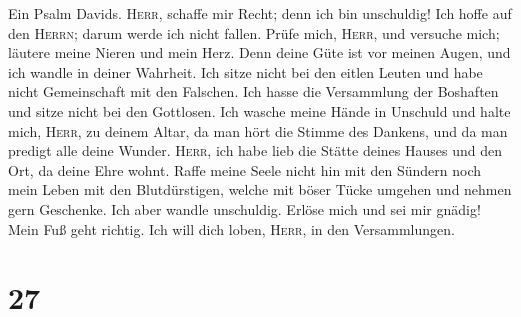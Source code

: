  Ein Psalm Davids. \textsc{Herr}, schaffe mir Recht; denn
ich bin unschuldig! Ich hoffe auf den \textsc{Herrn}; darum werde ich
nicht fallen.  Prüfe mich, \textsc{Herr}, und versuche
mich; läutere meine Nieren und mein Herz.  Denn deine Güte
ist vor meinen Augen, und ich wandle in deiner Wahrheit. 
Ich sitze nicht bei den eitlen Leuten und habe nicht Gemeinschaft mit
den Falschen.  Ich hasse die Versammlung der Boshaften und
sitze nicht bei den Gottlosen.  Ich wasche meine Hände in
Unschuld und halte mich, \textsc{Herr}, zu deinem Altar, 
da man hört die Stimme des Dankens, und da man predigt alle deine
Wunder.  \textsc{Herr}, ich habe lieb die Stätte deines
Hauses und den Ort, da deine Ehre wohnt.  Raffe meine
Seele nicht hin mit den Sündern noch mein Leben mit den Blutdürstigen,
 welche mit böser Tücke umgehen und nehmen gern
Geschenke.  Ich aber wandle unschuldig. Erlöse mich und
sei mir gnädig!  Mein Fuß geht richtig. Ich will dich
loben, \textsc{Herr}, in den Versammlungen.

\hypertarget{section-26}{%
\section{27}\label{section-26}}

